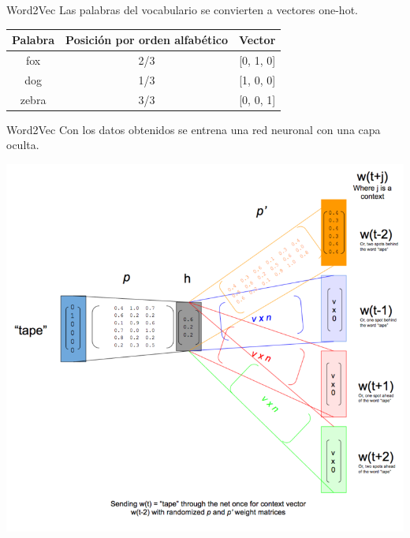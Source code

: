 \documentclass[table]{beamer}
\begin{document}
  \begin{frame}{Word2Vec}
      Las palabras del vocabulario se convierten a vectores one-hot.

      \begin{table}
          \centering
          \begin{tabular}{ccc}
              \toprule
              Palabra & Posición por orden alfabético & Vector\\
              \midrule
              fox & 2/3 & [0, 1, 0]\\
              dog & 1/3 & [1, 0, 0]\\
              zebra & 3/3 & [0, 0, 1]\\
              \bottomrule
          \end{tabular}
      \end{table}
  \end{frame}

  \begin{frame}{Word2Vec}
      Con los datos obtenidos se entrena una red neuronal con una capa oculta.

      \centering
      \includegraphics[scale=0.50]{./figures/skip-gram-exp.png}
  \end{frame}
\end{document}
